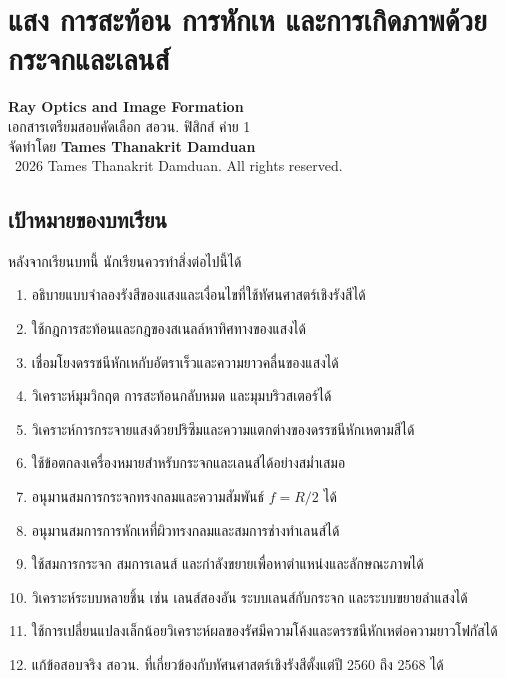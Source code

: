 %

\chapter{แสง การสะท้อน การหักเห และการเกิดภาพด้วยกระจกและเลนส์}

\begin{center}
    {\Large \textbf{Ray Optics and Image Formation}}\\[4pt]
    {\normalsize เอกสารเตรียมสอบคัดเลือก สอวน. ฟิสิกส์ ค่าย 1}\\[6pt]
    {\normalsize จัดทำโดย \textbf{Tames Thanakrit Damduan}}\\[2pt]
    {\footnotesize \textcopyright\ 2026 Tames Thanakrit Damduan. All rights reserved.}\\[8pt]
\end{center}

\sloppy

\section*{เป้าหมายของบทเรียน}

หลังจากเรียนบทนี้ นักเรียนควรทำสิ่งต่อไปนี้ได้

\begin{enumerate}
    \item อธิบายแบบจำลองรังสีของแสงและเงื่อนไขที่ใช้ทัศนศาสตร์เชิงรังสีได้
    \item ใช้กฎการสะท้อนและกฎของสเนลล์หาทิศทางของแสงได้
    \item เชื่อมโยงดรรชนีหักเหกับอัตราเร็วและความยาวคลื่นของแสงได้
    \item วิเคราะห์มุมวิกฤต การสะท้อนกลับหมด และมุมบริวสเตอร์ได้
    \item วิเคราะห์การกระจายแสงด้วยปริซึมและความแตกต่างของดรรชนีหักเหตามสีได้
    \item ใช้ข้อตกลงเครื่องหมายสำหรับกระจกและเลนส์ได้อย่างสม่ำเสมอ
    \item อนุมานสมการกระจกทรงกลมและความสัมพันธ์ $f=R/2$ ได้
    \item อนุมานสมการการหักเหที่ผิวทรงกลมและสมการช่างทำเลนส์ได้
    \item ใช้สมการกระจก สมการเลนส์ และกำลังขยายเพื่อหาตำแหน่งและลักษณะภาพได้
    \item วิเคราะห์ระบบหลายชิ้น เช่น เลนส์สองอัน ระบบเลนส์กับกระจก และระบบขยายลำแสงได้
    \item ใช้การเปลี่ยนแปลงเล็กน้อยวิเคราะห์ผลของรัศมีความโค้งและดรรชนีหักเหต่อความยาวโฟกัสได้
    \item แก้ข้อสอบจริง สอวน. ที่เกี่ยวข้องกับทัศนศาสตร์เชิงรังสีตั้งแต่ปี 2560 ถึง 2568 ได้
\end{enumerate}


